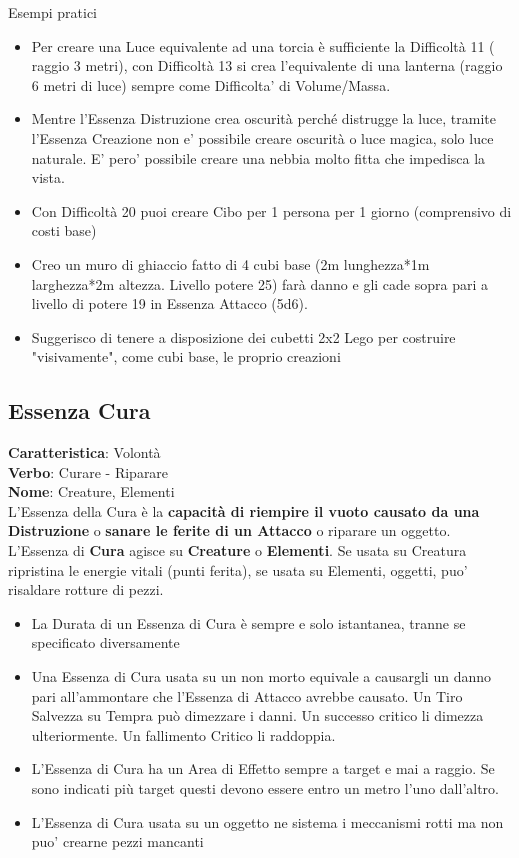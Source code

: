 \documentclass[a4paper,11pt,twoside,openany]{book}
\begin{document}
Esempi pratici
\begin{itemize}
	\item Per creare una Luce equivalente ad una torcia è sufficiente la Difficoltà 11 ( raggio 3 metri), con Difficoltà 13 si crea l'equivalente di una lanterna (raggio 6 metri di luce) sempre come Difficolta' di Volume/Massa.
	\item Mentre l'Essenza Distruzione crea oscurità perché distrugge la luce, tramite l'Essenza Creazione non e' possibile creare oscurità o luce magica, solo luce naturale. E' pero' possibile creare una nebbia molto fitta che impedisca la vista.
	\item Con Difficoltà 20 puoi creare Cibo per 1 persona per 1 giorno (comprensivo di costi base)
	\item Creo un muro di ghiaccio fatto di 4 cubi base (2m lunghezza{*}1m larghezza{*}2m altezza. Livello potere 25) farà danno e gli cade sopra pari a livello di potere 19 in Essenza Attacco (5d6).
	\item Suggerisco di tenere a disposizione dei cubetti 2x2 Lego per costruire "visivamente", come cubi base, le proprio creazioni
\end{itemize}

\pagebreak

\subsection{Essenza Cura}

\label{essenza-cura---volonta}


\textbf{Caratteristica}: Volontà\\
\textbf{Verbo}: Curare - Riparare\\
\textbf{Nome}: Creature, Elementi\\

L'Essenza della Cura è la \textbf{capacità di riempire il vuoto causato da una Distruzione} o \textbf{sanare le ferite di un Attacco} o riparare un oggetto. L'Essenza di \textbf{Cura} agisce su \textbf{Creature} o \textbf{Elementi}. Se usata su Creatura ripristina le energie vitali (punti ferita), se usata su Elementi, oggetti, puo' risaldare rotture di pezzi.


\begin{itemize}
	\item
	      La Durata di un Essenza di Cura è sempre e solo istantanea, tranne se specificato diversamente
	\item
	      Una Essenza di Cura usata su un non morto equivale a causargli un danno pari all'ammontare che l'Essenza di Attacco avrebbe causato. Un Tiro Salvezza su Tempra può dimezzare i danni. Un successo critico li dimezza ulteriormente. Un fallimento Critico li raddoppia.
	\item
	      L'Essenza di Cura ha un Area di Effetto sempre a target e mai a raggio. Se sono indicati più target questi devono essere entro un metro l'uno dall'altro.
	\item      
	     L'Essenza di Cura usata su un oggetto ne sistema i meccanismi rotti ma non puo' crearne pezzi mancanti 
\end{itemize}
\end{document}
